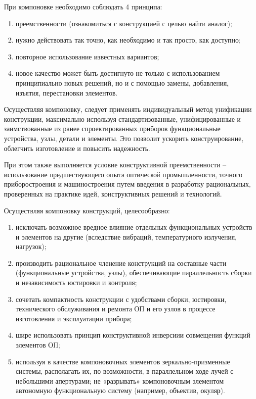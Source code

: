 При компоновке необходимо соблюдать 4 принципа:
\begin{enumerate}
	\item преемственности (ознакомиться с конструкцией с целью найти аналог);
	\item нужно действовать так точно, как необходимо и так просто, как доступно;
	\item повторное использование известных вариантов;
	\item новое качество может быть достигнуто не только с использованием принципиально новых решений, но и с помощью замены, добавления, изъятия, перестановки элементов. 
\end{enumerate}

Осуществляя компоновку, следует применять индивидуальный метод унификации конструкции, максимально используя стандартизованные, унифицированные и заимствованные из ранее спроектированных приборов функциональные устройства, узлы, детали и элементы. Это позволит ускорить конструирование, облегчить изготовление и повысить надежность. 

При этом также выполняется условие конструктивной преемственности -- использование предшествующего опыта оптической промышленности, точного приборостроения и машиностроения путем введения в разработку рациональных, проверенных на практике идей, конструктивных решений и технологий.

Осуществляя компоновку конструкций, целесообразно:
\begin{enumerate}
	\item исключать возможное вредное влияние отдельных функциональных устройств и элементов на другие (вследствие вибраций, температурного излучения, нагрузок);
	\item производить рациональное членение конструкций на составные части (функциональные устройства, узлы), обеспечивающие параллельность сборки и независимость юстировки и контроля;
	\item сочетать компактность конструкции с удобствами сборки, юстировки, технического обслуживания и ремонта ОП и его узлов в процессе изготовления и эксплуатации прибора;
	\item шире использовать принцип конструктивной инверсиии совмещения функций элементов ОП;
	\item используя в качестве компоновочных элементов зеркально-призменные системы, располагать их, по возможности, в параллельном ходе лучей с небольшими апертурами; не «разрывать» компоновочным элементом автономную функциональную систему (например, объектив, окуляр).
\end{enumerate}

